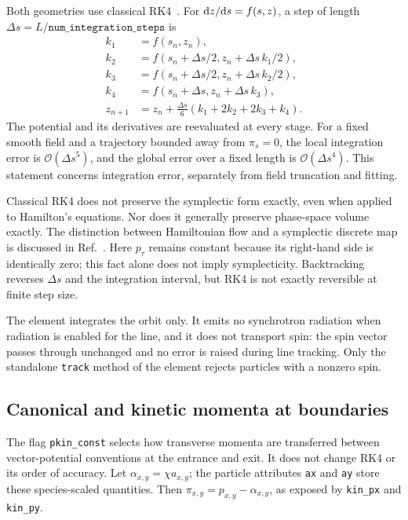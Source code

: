 Both geometries use classical RK4~\cite{HairerNorsettWanner1993}. For
\(\text{d} z/\text{d} s=f(s,z)\), a step of length
\(\Delta s=L/\texttt{num\_integration\_steps}\) is
\begin{align}
 k_1&=f(s_n,z_n),\\
 k_2&=f(s_n+\Delta s/2,z_n+\Delta s\,k_1/2),\\
 k_3&=f(s_n+\Delta s/2,z_n+\Delta s\,k_2/2),\\
 k_4&=f(s_n+\Delta s,z_n+\Delta s\,k_3),\\
 z_{n+1}&=z_n+\frac{\Delta s}{6}(k_1+2k_2+2k_3+k_4).
\end{align}
The potential and its derivatives are reevaluated at every stage. For a
fixed smooth field and a trajectory bounded away from \(\pi_s=0\), the
local integration error is \(\mathcal O(\Delta s^5)\), and the global
error over a fixed length is \(\mathcal O(\Delta s^4)\). This statement
concerns integration error, separately from field truncation and fitting.

Classical RK4 does not preserve the symplectic form exactly, even when
applied to Hamilton's equations. Nor does it generally preserve phase-space
volume exactly. The distinction between Hamiltonian flow and a symplectic
discrete map is discussed in Ref.~\cite{HairerLubichWanner2006}.
Here \(p_\tau\) remains constant because its right-hand side is identically
zero; this fact alone does not imply symplecticity. Backtracking reverses
\(\Delta s\) and the integration interval, but RK4 is not exactly reversible
at finite step size.

The element integrates the orbit only. It emits no synchrotron radiation
when radiation is enabled for the line, and it does not transport spin:
the spin vector passes through unchanged and no error is raised during
line tracking. Only the standalone \texttt{track} method of the element
rejects particles with a nonzero spin.

\subsection{Canonical and kinetic momenta at boundaries}

The flag \texttt{pkin\_const} selects how transverse momenta are transferred
between vector-potential conventions at the entrance and exit. It does not
change RK4 or its order of accuracy. Let
\(\alpha_{x,y}=\chi a_{x,y}\); the particle attributes \texttt{ax} and
\texttt{ay} store these species-scaled quantities. Then
\(\pi_{x,y}=p_{x,y}-\alpha_{x,y}\), as exposed by
\texttt{kin\_px} and \texttt{kin\_py}.

